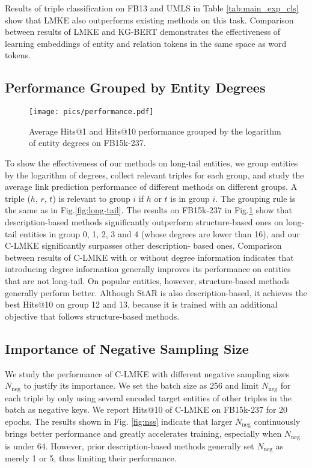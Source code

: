 \documentclass{article}
\begin{document}
Results of triple classification on FB13 and UMLS in Table \ref{tab:main_exp_cls} show that LMKE also outperforms existing methods on this task. Comparison between results of LMKE and KG-BERT demonstrates the effectiveness of learning embeddings of entity and relation tokens in the same space as word tokens. 


\subsection{Performance Grouped by Entity Degrees}
\begin{figure}[b]
    \centering
\texttt{[image: pics/performance.pdf]}
    \caption{
    Average Hits@1 and Hits@10 performance grouped by the logarithm of entity degrees on FB15k-237. }
    \label{fig:groupby}
\end{figure}
To show the effectiveness of our methods on long-tail entities, 
we group entities by the logarithm of degrees,
collect relevant triples for each group,
and study the average link prediction performance of different methods on different groups. 
A triple ($h$, $r$, $t$) is relevant to group $i$ if $h$ or $t$ is in group $i$. 
The grouping rule is the same as in Fig.\ref{fig:long-tail}.
The results on FB15k-237 in Fig.\ref{fig:groupby} show that description-based methods significantly outperform structure-based ones on long-tail entities in group 0, 1, 2, 3 and 4 (whose degrees are lower than 16), and our C-LMKE significantly surpasses other description-
based ones.  
Comparison between results of C-LMKE with or without degree information indicates that introducing degree information generally improves its performance on entities that are not long-tail.  
On popular entities, however, structure-based methods generally perform better. 
Although StAR is also description-based, it achieves the best Hits@10 on group 12 and 13, 
because it is trained with an additional objective that follows structure-based methods. 


\subsection{Importance of Negative Sampling Size}

We study the performance of C-LMKE with different negative sampling sizes $N_{\text{neg}}$ to justify its importance. 
We set the batch size as 256 and limit $N_{\text{neg}}$ for each triple by only using several encoded target entities of other triples in the batch as negative keys. 
We report Hits@10 of C-LMKE on FB15k-237 for 20 epochs. 
The results shown in Fig. \ref{fig:nss} indicate that larger $N_{\text{neg}}$ continuously brings better performance and greatly accelerates training, especially when $N_{\text{neg}}$ is under 64. 
However, prior description-based methods generally set $N_{\text{neg}}$  as merely 1 or 5, thus limiting their performance.
\end{document}
